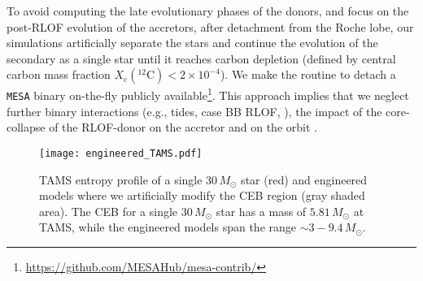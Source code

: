\documentclass[twocolumn,twocolappendix,trackchanges]{aastex63}
\begin{document}
To avoid computing the late evolutionary phases of the donors, and
focus on the post-RLOF evolution of the accretors, after detachment
from the Roche lobe, our simulations artificially separate the
stars %
and continue the evolution of the secondary as a single star until it
reaches carbon depletion (defined by central carbon mass fraction
$X_\mathrm{c}(^{12}\mathrm{C})<2\times10^{-4} $). We make the routine
to detach a \texttt{MESA} binary on-the-fly publicly
available\footnote{\url{https://github.com/MESAHub/mesa-contrib/}}.
This approach implies that we neglect further binary interactions
(e.g., tides, case BB RLOF, \citealt{laplace:2020}), the impact of the
core-collapse of the RLOF-donor on the accretor \cite[e.g.,][]{hirai:2018,
  ogata:2021} and on the orbit \citep[e.g.,][]{brandt:1995,
  kalogera:1996, tauris:1998, renzo:2019walk}.


\begin{figure}[btp]
  \texttt{[image: engineered\_TAMS.pdf]}
  \caption{TAMS entropy profile of a single 30\,$M_\odot$ star (red)
    and engineered models where we artificially modify the
    CEB region (gray shaded area). The CEB for a single $30\,M_\odot$
    star has a mass of $5.81\,M_\odot$ at TAMS, while the engineered
    models span the range $\sim3-9.4\,M_\odot$.}
  \label{fig:engineered_TAMS}
\end{figure}
\end{document}
